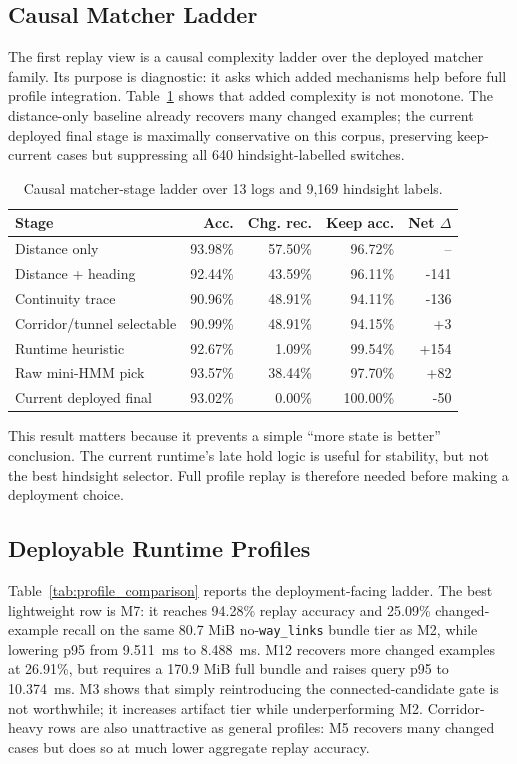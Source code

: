 \documentclass[sigconf]{acmart}
\begin{document}
\subsection{Causal Matcher Ladder}

The first replay view is a causal complexity ladder over the deployed matcher family. Its purpose is diagnostic: it asks which added mechanisms help before full profile integration. Table~\ref{tab:causal_ladder} shows that added complexity is not monotone. The distance-only baseline already recovers many changed examples; the current deployed final stage is maximally conservative on this corpus, preserving keep-current cases but suppressing all 640 hindsight-labelled switches.

\begin{table}[t]
\caption{Causal matcher-stage ladder over 13 logs and 9,169 hindsight labels.}
\label{tab:causal_ladder}
\centering
\scriptsize
\begin{tabular}{p{3.25cm}rrrr}
\toprule
Stage & Acc. & Chg. rec. & Keep acc. & Net \(\Delta\) \\
\midrule
Distance only & 93.98\% & 57.50\% & 96.72\% & -- \\
Distance + heading & 92.44\% & 43.59\% & 96.11\% & -141 \\
Continuity trace & 90.96\% & 48.91\% & 94.11\% & -136 \\
Corridor/tunnel selectable & 90.99\% & 48.91\% & 94.15\% & +3 \\
Runtime heuristic & 92.67\% & 1.09\% & 99.54\% & +154 \\
Raw mini-HMM pick & 93.57\% & 38.44\% & 97.70\% & +82 \\
Current deployed final & 93.02\% & 0.00\% & 100.00\% & -50 \\
\bottomrule
\end{tabular}
\end{table}

This result matters because it prevents a simple ``more state is better'' conclusion. The current runtime's late hold logic is useful for stability, but not the best hindsight selector. Full profile replay is therefore needed before making a deployment choice.

\subsection{Deployable Runtime Profiles}

Table~\ref{tab:profile_comparison} reports the deployment-facing ladder. The best lightweight row is M7: it reaches 94.28\% replay accuracy and 25.09\% changed-example recall on the same 80.7 MiB no-\texttt{way\_links} bundle tier as M2, while lowering p95 from \SI{9.511}{ms} to \SI{8.488}{ms}. M12 recovers more changed examples at 26.91\%, but requires a 170.9 MiB full bundle and raises query p95 to \SI{10.374}{ms}. M3 shows that simply reintroducing the connected-candidate gate is not worthwhile; it increases artifact tier while underperforming M2. Corridor-heavy rows are also unattractive as general profiles: M5 recovers many changed cases but does so at much lower aggregate replay accuracy.
\end{document}
